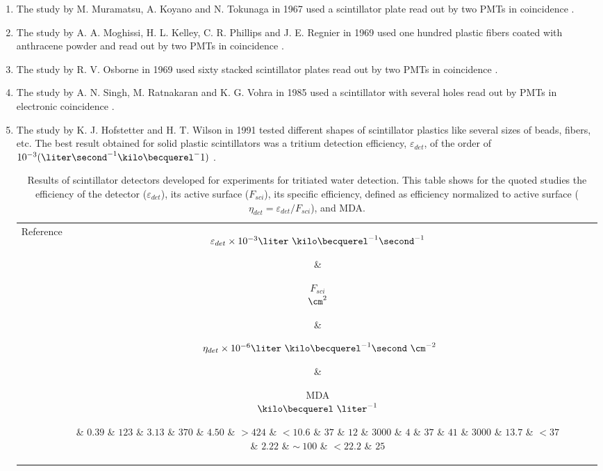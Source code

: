 \begin{enumerate}

\item{} The study by M. Muramatsu, A. Koyano and N. Tokunaga in 1967 used a scintillator plate read out by two PMTs in coincidence \cite{Muramatsu}.

\item{} The study by A. A. Moghissi, H. L. Kelley, C. R. Phillips and J. E. Regnier in 1969 used one hundred plastic fibers coated with anthracene powder and read out by two PMTs in coincidence \cite{Moghissi}.

\item{} The study by R. V. Osborne in 1969 used sixty stacked scintillator plates read out by two PMTs in coincidence \cite{Osborne}.

\item{} The study by A. N. Singh, M. Ratnakaran and K. G. Vohra in 1985 used a scintillator with several holes read out by PMTs in electronic coincidence \cite{Ratnakaran, Ratnakaran2000}.

\item{} The study by K. J. Hofstetter and H. T. Wilson in 1991 tested different shapes of scintillator plastics like several sizes of beads, fibers, etc. The best result obtained for solid plastic scintillators was a tritium detection efficiency, $\varepsilon_{det}$, of the order of $10^{-3}(\liter\second^{-1}\kilo\becquerel^{-}1)$ \cite{Hofstetter1, Hofstetter2}.

\begin{table}[htbp]
\centering{}%
\begin{tabular}{lcrcc}
\toprule 
Reference & \parbox{5em}{$\varepsilon_{det}\times10^{-3}\\\liter~\kilo\becquerel^{-1}\second^{-1}$}  & \parbox{3.5em}{\raggedleft $F_{sci}$\\ $\cm^2$}  & \parbox{6.5em}{$~\eta_{det}\times 10^{-6}\\\liter~\kilo\becquerel^{-1}\second~\cm^{-2}$} &  \parbox{3.5em}{MDA\\$\kilo\becquerel~\liter^{-1}$} \tabularnewline
\midrule
\midrule 
\cite{Muramatsu} & $0.39$ & $123$ & $3.13$ & $370$ \tabularnewline
\cite{Moghissi} & $4.50$ & $>424$ & $<10.6$ & $37$ \tabularnewline
\cite{Osborne} & $12$ & $3000$ & $4$ & $37$ \tabularnewline
\cite{Ratnakaran} & $41$ & $3000$ & $13.7$ & $<37$ \tabularnewline
\cite{Hofstetter1} & $2.22$ & $\sim~100$ & $<22.2$ & $25$ \tabularnewline
\bottomrule
\end{tabular}
\caption{Results of scintillator detectors developed for experiments for tritiated water detection. This table shows for the quoted studies the efficiency of the detector ($\varepsilon_{det}$), its active surface ($F_{sci}$), its specific efficiency, defined as efficiency normalized to active surface ($\eta_{det}=\varepsilon_{det}/F_{sci}$), and MDA.}
\label{tab:PlasticScinTritium}
\end{table}

\end{enumerate}

